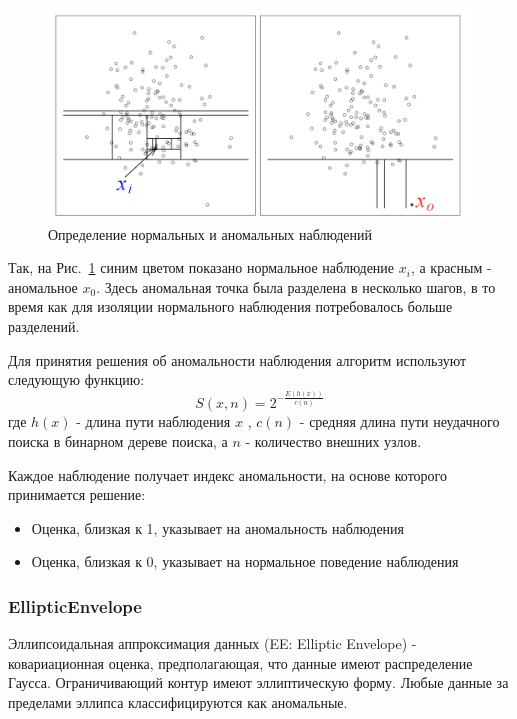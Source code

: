 \documentclass[12pt]{article}
\begin{document}
    \begin{figure}[h]
        \centering
        \includegraphics[width=0.8\linewidth]{IsolationForest.png}
        \caption{Определение нормальных и аномальных наблюдений}
        \label{sec:Research:Model:IsolationForest:fig:IsolationForest}
    \end{figure}
    
    \par Так, на Рис.~\ref{sec:Research:Model:IsolationForest:fig:IsolationForest} синим цветом показано нормальное наблюдение $x_i$, а красным - аномальное $x_0$. Здесь аномальная точка была разделена в несколько шагов, в то время как для изоляции нормального наблюдения потребовалось больше разделений.\\
    
    \par Для принятия решения об аномальности наблюдения алгоритм используют следующую функцию:
    $$
    S(x,n) = 2^{-\frac{E(h(x))}{c(n)}}
    $$
    \noident где $h(x)$ - длина пути наблюдения $x$ , $c(n)$ - средняя длина пути неудачного поиска в бинарном дереве поиска, а $n$ - количество внешних узлов. \\

    \par Каждое наблюдение получает индекс аномальности, на основе которого принимается решение:
    \begin{itemize}
        \item Оценка, близкая к 1, указывает на аномальность наблюдения
        \item Оценка, близкая к 0, указывает на нормальное поведение наблюдения
    \end{itemize}

    \subsubsection{EllipticEnvelope}
    \label{sec:Research:Model:EllipticEnvelope}

    \par Эллипсоидальная аппроксимация данных (EE: Elliptic Envelope) - ковариационная оценка, предполагающая, что данные имеют распределение Гаусса. Ограничивающий контур имеют эллиптическую форму. Любые данные за пределами эллипса классифицируются как аномальные. \\
\end{document}
